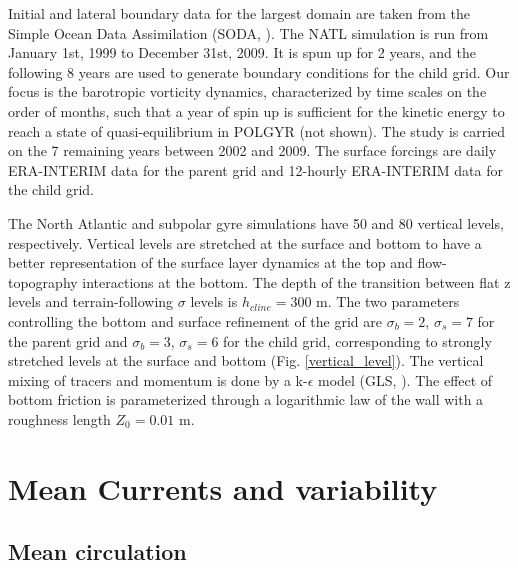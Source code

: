 \documentclass{ametsoc}
\newcommand{\jg}[1]{\textcolor{red}{JG: #1}}
\begin{document}
Initial and lateral boundary data for the largest domain are taken from the Simple Ocean Data Assimilation (SODA, \citet{carton2008}). The NATL simulation is run from January 1st, 1999 to December 31st, 2009. It is spun up for 2 years, and the following 8 years are used to generate boundary conditions for the child grid. Our focus is the barotropic vorticity dynamics, characterized by time scales on the order of months, such that a year of spin up is sufficient for the kinetic energy to reach a state of quasi-equilibrium in POLGYR (not shown). The study is carried on the 7 remaining years between 2002 and 2009. The surface forcings are daily ERA-INTERIM data for the parent grid and 12-hourly ERA-INTERIM data for the child grid. %

The North Atlantic and subpolar gyre simulations have 50 and 80 vertical levels, respectively. Vertical levels are stretched at the surface and bottom \citep{lemarie2012} to have a better representation of the surface layer dynamics at the top and flow-topography interactions at the bottom. The depth of the transition between flat z levels and terrain-following $\sigma$ levels is $h_{cline} = 300$ m. The two parameters controlling the bottom and surface refinement of the grid are $\sigma _b=2$, $\sigma _s=7$ for the parent grid and $\sigma _b=3$, $\sigma _s=6$ for the child grid, corresponding to strongly stretched levels at the surface and bottom (Fig. \ref{vertical_level}).
The vertical mixing of tracers and momentum is done by a k-$\epsilon$ model (GLS, \citet{umlauf2003}). The effect of bottom friction is parameterized through a logarithmic law of the wall with a roughness length $Z_{0} = 0.01$ m.


\section{Mean Currents and variability}
\subsection{Mean circulation}
\end{document}
